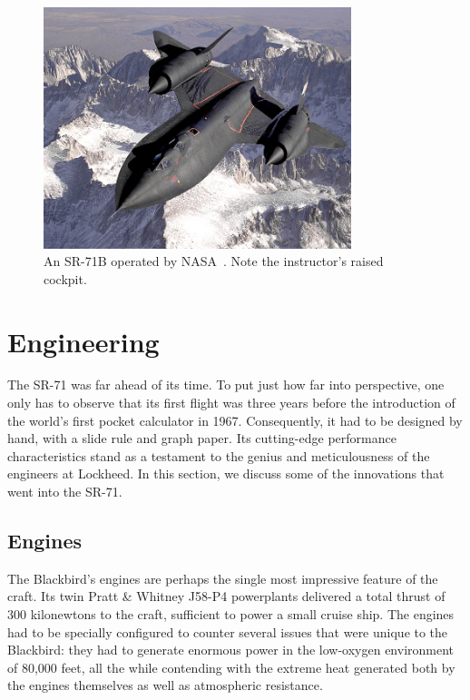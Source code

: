 \documentclass[12pt, draftclsnofoot, onecolumn]{IEEEtran}
\begin{document}
\begin{figure}[h]
	\centering
	\includegraphics[width=0.8\textwidth]{sr71b.jpg}
	\caption{An SR-71B operated by NASA~\cite{dryden}. Note the instructor's raised cockpit.}
\end{figure}

	
\section{Engineering}

The SR-71 was far ahead of its time. To put just how far into perspective, one only has to observe that its first flight was three years before the introduction of the world's first pocket calculator in 1967. Consequently, it had to be designed by hand, with a slide rule and graph paper. Its cutting-edge performance characteristics stand as a testament to the genius and meticulousness of the engineers at Lockheed. In this section, we discuss some of the innovations that went into the SR-71.

	\subsection{Engines}
	The Blackbird's engines are perhaps the single most impressive feature of the craft. Its twin Pratt \& Whitney J58-P4 powerplants delivered a total thrust of 300 kilonewtons\cite{engines} to the craft, sufficient to power a small cruise ship. The engines had to be specially configured to counter several issues that were unique to the Blackbird: they had to generate enormous power in the low-oxygen environment of 80,000 feet, all the while contending with the extreme heat generated both by the engines themselves as well as atmospheric resistance.
	
\end{document}
